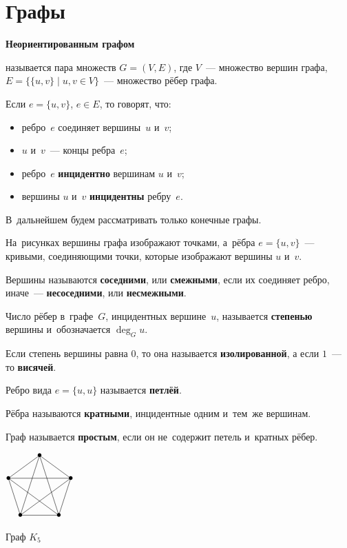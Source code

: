 \section{Графы}
\hypertarget{def:undirected_graph}{\textbf{Неориентированным графом}} называется пара множеств $G = (V, E)$, где $V$~--- множество вершин графа, $E = \{ \{ u, v \} \mid u, v \in V \}$~--- множество рёбер графа.

Если $e = \{ u, v \}$, $e \in E$, то говорят, что:
\begin{itemize}
	\item ребро~$e$ соединяет вершины~$u$ и~$v$;
	\item $u$ и~$v$~--- концы ребра~$e$;
	\item \hypertarget{def:incidence}{} ребро~$e$ \textbf{инцидентно} вершинам $u$ и~$v$;
	\item вершины $u$ и~$v$ \textbf{инцидентны} ребру~$e$.
\end{itemize}

В~дальнейшем будем рассматривать только конечные графы.

На~рисунках вершины графа изображают точками, а~рёбра $e = \{ u, v \}$~--- кривыми, соединяющими точки, которые изображают вершины $u$ и~$v$.

\hypertarget{def:adjacency_of_vertexes}{} Вершины называются \textbf{соседними}, или \textbf{смежными}, если их соединяет ребро, иначе~--- \textbf{несоседними}, или \textbf{несмежными}.

\hypertarget{def:degree_of_vertex}{} Число рёбер в~графе~$G$, инцидентных вершине~$u$, называется \textbf{степенью} вершины и~обозначается $\deg_G u$.

\hypertarget{def:isolated_vertex}{}\hypertarget{def:leaf_vertex}{} Если степень вершины равна $0$, то она называется \textbf{изолированной}, а если $1$~--- то \textbf{висячей}.

\hypertarget{def:loop}{} Ребро вида $e = \{ u, u \}$ называется \textbf{петлёй}.

\hypertarget{def:multiple_edge}{} Рёбра называются \textbf{кратными}, инцидентные одним и~тем~же вершинам.

\hypertarget{def:simple_graph}{} Граф называется \textbf{простым}, если он не~содержит петель и~кратных рёбер.

\begin{floatingfigure}[r]{30mm} \centering
\noindent
$\begin{xy} /r0.4mm/:
(30, 60) = "1" *{\bullet}; %
(58.532, 39.271) = "2" *{\bullet}; %
(47.634, 5.729) = "3" *{\bullet}; %
(12.366, 5.729) = "4" *{\bullet}; %
(1.468, 39.271) = "5" *{\bullet}; %
"5"; "1" **@{-}; "2" **@{-}; "3" **@{-}; "4" **@{-}; "5" **@{-};
"2" **@{-}; "4" **@{-}; "1" **@{-}; "3" **@{-}; "5" **@{-};
\end{xy}$
\caption{Граф $K_5$}
\end{floatingfigure}

